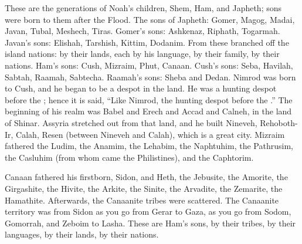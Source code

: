 
\begin{inparaenum}
   These are the generations of Noah's children, Shem, Ham, and Japheth; sons were born to them after the Flood.%
   The sons of Japheth: Gomer, Magog, Madai, Javan, Tubal, Meshech, Tiras.%
   Gomer's sons: Ashkenaz, Riphath, Togarmah.%
   Javan's sons: Elishah, Tarshish, Kittim, Dodanim.%
   From these branched off the island nations: by their lands, each by his language, by their family, by their nations.%
   Ham's sons: Cush, Mizraim, Phut, Canaan.%
   Cush's sons: Seba, Havilah, Sabtah, Raamah, Sabtecha. Raamah's sons: Sheba and Dedan.%
   Nimrod was born to Cush, and he began to be a despot in the land.%
   He was a hunting despot before the \lord; hence it is said, ``Like Nimrod, the hunting despot before the \lord.''%
   The beginning of his realm was Babel and Erech and Accad and Calneh, in the land of Shinar.%
   Assyria stretched out from that land, and he built Nineveh, Rehoboth-Ir, Calah,%
   Resen (between Nineveh and Calah), which is a great city.%
   Mizraim fathered the Ludim, the Anamim, the Lehabim, the Naphtuhim,%
   the Pathrusim, the Casluhim (from whom came the Philistines), and the Caphtorim.%

   Canaan fathered his firstborn, Sidon, and Heth,%
   the Jebusite, the Amorite, the Girgashite,%
   the Hivite, the Arkite, the Sinite,%
   the Arvadite, the Zemarite, the Hamathite. Afterwards, the Canaanite tribes were scattered.%
   The Canaanite territory was from Sidon as you go from Gerar to Gaza, as you go from Sodom, Gomorrah, and Zeboim to Lasha.%
   These are Ham's sons, by their tribes, by their languages, by their lands, by their nations.%


\end{inparaenum}
